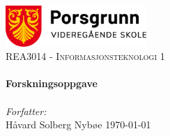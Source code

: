 \begin{titlepage}
\vbox{ }

\vbox{ }

\begin{center}
\includegraphics[width=0.40\textwidth]{img/porsgrunn-vgs.png}\\[1cm]
\textsc{\Large REA3014 - Informasjonsteknologi 1}\\[0.6cm]

\vbox{ }
\noindent\makebox[\linewidth]{\rule{.7\paperwidth}{.6pt}}\\[0.8cm]
{ \huge \bfseries Forskningsoppgave}\\[0.4cm]
\noindent\makebox[\linewidth]{\rule{.7\paperwidth}{.6pt}}\\[1.5cm]
\large
\emph{Forfatter:}\\[1mm]
Håvard Solberg Nybøe
\vfill
{\large \today}
\end{center}
\end{titlepage}